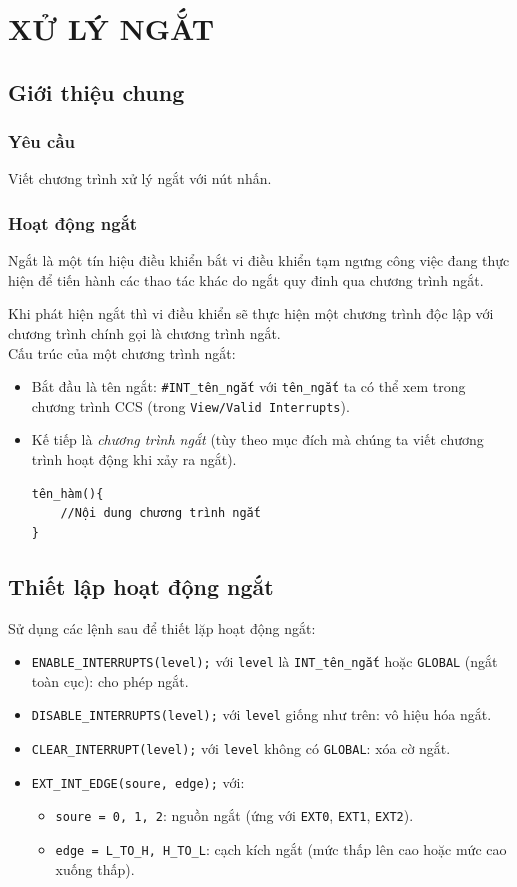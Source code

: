 \chapter{XỬ LÝ NGẮT}
\section{Giới thiệu chung}
\subsection{Yêu cầu}
Viết chương trình xử lý ngắt với nút nhấn.
\subsection{Hoạt động ngắt}
Ngắt là một tín hiệu điều khiển bắt vi điều khiển tạm ngưng công việc đang thực hiện để tiến hành các thao tác khác do ngắt quy đinh qua chương trình ngắt.

Khi phát hiện ngắt thì vi điều khiển sẽ thực hiện một chương trình độc lập với chương trình chính gọi là chương trình ngắt.\\

Cấu trúc của một chương trình ngắt:
\begin{itemize}
\item Bắt đầu là tên ngắt: \verb|#INT_tên_ngắt| với \verb|tên_ngắt| ta có thể xem trong chương trình CCS (trong \verb|View/Valid Interrupts|).
\item Kế tiếp là \emph{chương trình ngắt} (tùy theo mục đích mà chúng ta viết chương trình hoạt động khi xảy ra ngắt).
\begin{verbatim}
tên_hàm(){
    //Nội dung chương trình ngắt
}
\end{verbatim}
\end{itemize}
\section{Thiết lập hoạt động ngắt}\label{Sec:int}
Sử dụng các lệnh sau để thiết lặp hoạt động ngắt:
\begin{itemize}
\item \verb|ENABLE_INTERRUPTS(level);| với \verb|level| là \verb|INT_tên_ngắt| hoặc \verb|GLOBAL| (ngắt toàn cục): cho phép ngắt.
\item \verb|DISABLE_INTERRUPTS(level);| với \verb|level| giống như trên: vô hiệu hóa ngắt.
\item \verb|CLEAR_INTERRUPT(level);| với \verb|level| không có \verb|GLOBAL|: xóa cờ ngắt.
\item \verb|EXT_INT_EDGE(soure, edge);| với:
\begin{itemize}
\item \verb|soure = 0, 1, 2|: nguồn ngắt (ứng với \verb|EXT0|, \verb|EXT1|, \verb|EXT2|).
\item \verb|edge = L_TO_H, H_TO_L|: cạch kích ngắt (mức thấp lên cao hoặc mức cao xuống thấp).
\end{itemize}
\end{itemize}

